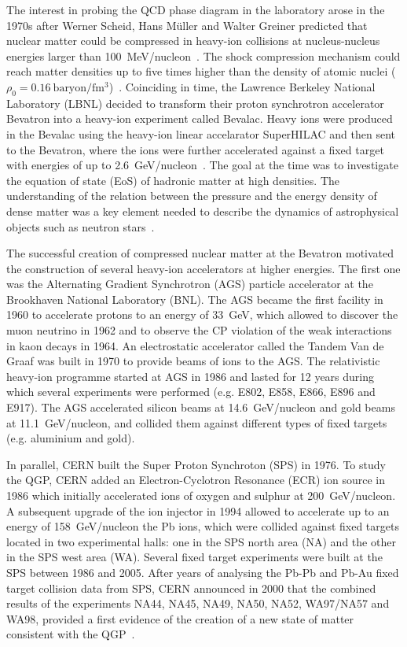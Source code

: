 The interest in probing the QCD phase diagram in the laboratory arose in the 1970s after Werner Scheid, Hans M{\"u}ller and Walter Greiner predicted that nuclear matter could be compressed in heavy-ion collisions at nucleus-nucleus energies larger than 100~\si{\MeV}/nucleon~\cite{MatterShock}. The shock compression mechanism could reach matter densities up to five times higher than the density of atomic nuclei ($\rho_{0}=0.16~\text{baryon}/\si{\femto\meter\cubed}$)~\cite{MatterShock}. Coinciding in time, the Lawrence Berkeley National Laboratory (LBNL) decided to transform their proton synchrotron accelerator Bevatron into a heavy-ion experiment called Bevalac. Heavy ions were produced in the Bevalac using the heavy-ion linear accelarator SuperHILAC and then sent to the Bevatron, where the ions were further accelerated against a fixed target with energies of up to \SI{2.6}{\GeV}/nucleon~\cite{Bevalac}. The goal at the time was to investigate the equation of state (EoS) of hadronic matter at high densities. The understanding of the relation between the pressure and the energy density of dense matter was a key element needed to describe the dynamics of astrophysical objects such as neutron stars~\cite{NeutronStar, DenseMatter}.

The successful creation of compressed nuclear matter at the Bevatron motivated the construction of several heavy-ion accelerators at higher energies. The first one was the Alternating Gradient Synchrotron (AGS) particle accelerator at the Brookhaven National Laboratory (BNL). The AGS became the first facility in 1960 to accelerate protons to an energy of \SI{33}{\GeV}, which allowed to discover the muon neutrino in 1962 and to observe the CP violation of the weak interactions in kaon decays in 1964. An electrostatic accelerator called the Tandem Van de Graaf was built in 1970 to provide beams of ions to the AGS. The relativistic heavy-ion programme started at AGS in 1986 and lasted for 12 years during which several experiments were performed (e.g. E802, E858, E866, E896 and E917). The AGS accelerated silicon beams at \SI{14.6}{\GeV}/nucleon and gold beams at \SI{11.1}{\GeV}/nucleon, and collided them against different types of fixed targets (e.g. aluminium and gold).

In parallel, CERN built the Super Proton Synchroton (SPS) in 1976. To study the QGP, CERN added an Electron-Cyclotron Resonance (ECR) ion source in 1986 which initially accelerated ions of oxygen and sulphur at \SI{200}{\GeV}/nucleon. A subsequent upgrade of the ion injector in 1994 allowed to accelerate up to an energy of \SI{158}{\GeV}/nucleon the Pb ions, which were collided against fixed targets located in two experimental halls: one in the SPS north area (NA) and the other in the SPS west area (WA). Several fixed target experiments were built at the SPS between 1986 and 2005. After years of analysing the Pb-Pb and Pb-Au fixed target collision data from SPS, CERN announced in 2000 that the combined results of the experiments NA44, NA45, NA49, NA50, NA52, WA97/NA57 and WA98, provided a first evidence of the creation of a new state of matter consistent with the QGP~\cite{SPSQGP}.

